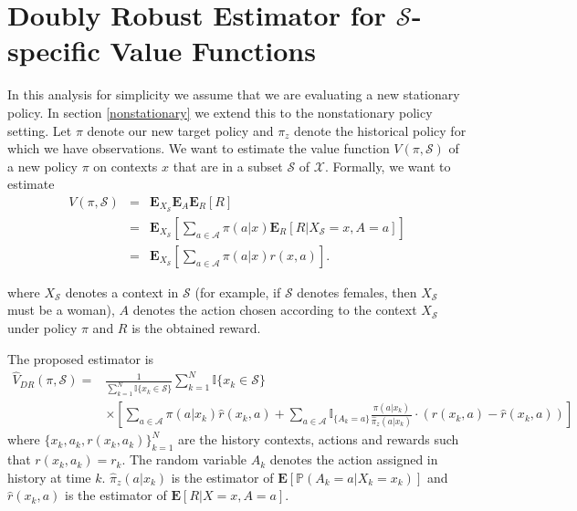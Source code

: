\section{Doubly Robust Estimator for $\mathcal{S}$-specific Value Functions} \label{drest}

In this analysis for simplicity we assume that we are evaluating a new stationary policy. In section \ref{nonstationary} we extend this to the nonstationary policy setting. Let $\pi$ denote our new target policy and $\pi_z$ denote the historical policy for which we have observations. We want to estimate the value function $V(\pi, \mathcal{S})$ of a new policy $\pi$ on contexts $x$ that are in a subset $\mathcal{S}$ of $\mathcal{X}$. Formally, we want to estimate
\begin{eqnarray*}
 V(\pi, \mathcal{S}) &=& \mathbf{E}_{X_\mathcal{S}} \mathbf{E}_{A}\mathbf{E}_{R} [R]\\
 &=& \mathbf{E}_{X_\mathcal{S}} \left[ \sum_{a \in \mathcal{A}} \pi(a|x) \mathbf{E}_{R}[R|X_\mathcal{S} = x,A=a] \right]\\
 &=& \mathbf{E}_{X_\mathcal{S}} \left[ \sum_{a \in \mathcal{A}} \pi(a|x) r(x, a)  \right].
\end{eqnarray*}

where $X_{\mathcal{S}}$ denotes a context in $\mathcal{S}$ (for example, if $\mathcal{S}$ denotes females, then $X_{\mathcal{S}}$ must be a woman), $A$ denotes the action chosen according to the context $X_{\mathcal{S}}$ under policy $\pi$ and $R$ is the obtained reward.  %

The proposed estimator is 
\begin{align*} 
\widehat{V}_{DR}(\pi, \mathcal{S}) = &\frac{1}{\sum_{k=1}^N \mathbb{I}{\{x_k \in \mathcal{S} \}}}  \sum_{k=1}^{N } \mathbb{I}{\{x_k \in \mathcal{S} \}} \\
&\times \left[\sum_{a \in \mathcal{A}} \pi(a|x_k)\hat{r}(x_k, a) + \sum_{a \in \mathcal{A}} \mathbb{I}_{\{A_k = a\}}\frac{\pi(a|x_k)}{\hat{\pi}_{z}(a|x_k)} \cdot (r(x_k, a) - \hat{r}(x_k, a)) \right]
 \end{align*}%
where ${\{x_k, a_k, r(x_k, a_k)\}}_{k=1}^N$ are the history contexts, actions and rewards such that $r(x_k, a_k) = r_k$. The random variable $A_k$ denotes the action assigned in history at time $k$. $\hat{\pi}_z(a|x_k)$ is the estimator of $\mathbf{E}[\mathbb{P}(A_k=a|X_k = x_k)]$ and $\hat{r}(x_k, a)$ is the estimator of $\mathbf{E}[R|X=x, A=a]$.


